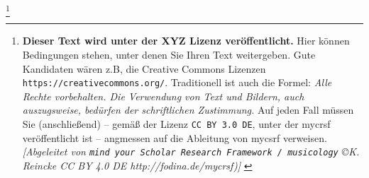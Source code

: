 %
%
%

\footnote{\small \textbf{Dieser Text wird unter der XYZ Lizenz veröffentlicht.}
Hier können Bedingungen stehen, unter denen Sie Ihren Text weitergeben.
Gute Kandidaten wären z.B, die Creative Commons Lizenzen
\texttt{https://creativecommons.org/}. Traditionell ist auch die Formel:
\emph{Alle Rechte vorbehalten. Die Verwendung von Text und Bildern, auch
auszugsweise, bedürfen der schriftlichen Zustimmung.} Auf jeden Fall müssen Sie
(anschließend) -- gemäß der Lizenz \texttt{CC BY 3.0 DE}, unter der mycrsf
veröffentlicht ist -- angmessen auf die Ableitung von mycsrf verweisen.
\newline 
{ \footnotesize \itshape [Abgeleitet von \texttt{mind your Scholar Research
Framework / musicology} \copyright K. Reincke CC BY 4.0 DE http://fodina.de/mycrsf)] }}

